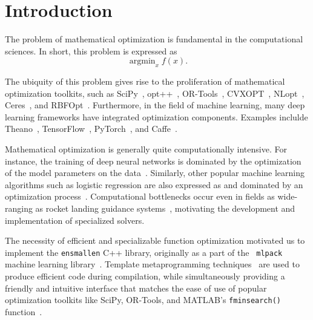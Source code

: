 \section{Introduction}
\label{sec:introduction}

The problem of mathematical optimization is fundamental in the computational
sciences.  In short, this problem is expressed as
%
\begin{equation}
\operatorname{argmin}_x f(x).
\end{equation}

The ubiquity of this problem gives rise to the proliferation of mathematical
optimization toolkits, such as SciPy~\cite{2019arXiv190710121V},
opt++~\cite{meza1994opt++},
OR-Tools~\cite{ortools}, CVXOPT~\cite{vandenberghe2010cvxopt},
NLopt~\cite{johnson2014nlopt}, Ceres~\cite{ceres-solver},
and RBFOpt~\cite{costa2018rbfopt}.
Furthermore, in the field of machine learning, many
deep learning frameworks have integrated optimization
components.  Examples inclulde Theano~\cite{2016arXiv160502688},
TensorFlow~\cite{tensorflow2015-whitepaper}, PyTorch~\cite{NEURIPS2019_9015},
and Caffe~\cite{jia2014caffe}.

Mathematical optimization is generally quite computationally intensive.
For instance, the training of deep neural networks is dominated by
the optimization of the model parameters on the
data~\cite{krizhevsky2012imagenet, lauzon2012introduction}.  Similarly,
other popular machine learning algorithms such as logistic regression are also
expressed as and dominated by an optimization process~\cite{zhang2004solving,
manogaran2018health}.  Computational bottlenecks occur even in fields as
wide-ranging as rocket landing guidance systems~\cite{dueri2016customized},
motivating the development and implementation of specialized solvers.

The necessity of efficient and specializable function optimization motivated us
to implement the {\tt ensmallen} C++ library, originally as a part of the {\tt
mlpack} machine learning library~\cite{mlpack2018}.
Template metaprogramming techniques~\cite{abrahams2004c++,alexandrescu2001modern,
veldhuizen1998c++} are used to produce efficient code during compilation,
while simultaneously providing a friendly and intuitive interface
that matches the ease of use of popular optimization toolkits like SciPy,
OR-Tools, and MATLAB's {\tt fminsearch()} function~\cite{matlab_fminsearch}.


